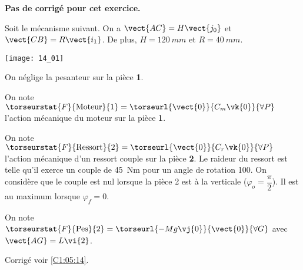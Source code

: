 \normalfalse \difficiletrue \tdifficilefalse
\correctionfalse


\setcounter{numques}{0}
\ifcorrection
\else
\textbf{Pas de corrigé pour cet exercice.}
\fi

\ifprof
\else
Soit le mécanisme suivant. On a $\vect{AC}=H\vect{j_0}$ et $\vect{CB}=R\vect{i_1}$. De plus, 
$H=\SI{120}{mm}$ et $R=\SI{40}{mm}$. 

\begin{center}
\texttt{[image: 14\_01]}
\end{center}
\fi

On néglige la pesanteur sur la pièce \textbf{1}. 

On note $\torseurstat{F}{\text{Moteur}}{1} = \torseurl{\vect{0}}{C_m\vk{0}}{\forall P}$ l'action mécanique du moteur sur la pièce \textbf{1}.

On note $\torseurstat{F}{\text{Ressort}}{2} = \torseurl{\vect{0}}{C_r\vk{0}}{\forall P}$ l'action mécanique d'un ressort couple sur la pièce \textbf{2}. Le raideur du ressort est telle qu'il exerce un couple de \SI{45}{Nm} pour un angle de rotation 100\degres. On considère que le couple est nul lorsque la pièce 2 est à la verticale ($\varphi_o=\dfrac{\pi}{2}$). Il est au maximum lorsque $\varphi_f=0$.

On note $\torseurstat{F}{\text{Pes}}{2} = \torseurl{-Mg\vj{0}}{\vect{0}}{\forall G}$ avec $\vect{AG}=L\vi{2}$. 

\ifprof
\else
\fi

\ifprof
\else
\fi

\ifprof
\else
\fi


\ifprof
\else
\begin{flushright}
\footnotesize{Corrigé  voir \ref{C1:05:14}.}
\end{flushright}%
\fi